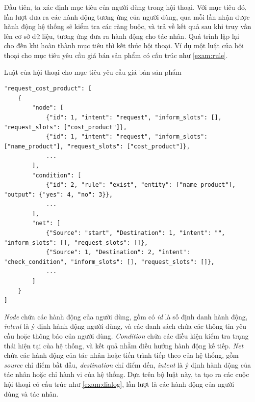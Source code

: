 Đầu tiên, ta xác định mục tiêu của người dùng trong hội thoại. Với
mục tiêu đó, lần lượt đưa ra các hành động tương ứng của người dùng,
qua mỗi lần nhận được hành động hệ thống sẽ kiểm tra các ràng buộc,
và trả về kết quả sau khi truy vấn lên cơ sở dữ liệu, tương ứng
đưa ra hành động cho tác nhân. Quá trình lặp lại cho đến khi
hoàn thành mục tiêu thì kết thúc hội thoại. Ví dụ một luật của
hội thoại cho mục tiêu yêu cầu giá bán sản phẩm có cấu trúc
như \ref{exam:rule}.

\renewcommand{\textboxenvname}{Ví dụ}
\begin{textbox}{Luật của hội thoại cho mục tiêu yêu cầu giá bán sản phẩm}
\begin{Verbatim}[breaklines=true, breakanywhere=true]
"request_cost_product": [
    {
        "node": [
            {"id": 1, "intent": "request", "inform_slots": [], "request_slots": ["cost_product"]},
            {"id": 1, "intent": "request", "inform_slots": ["name_product"], "request_slots": ["cost_product"]},
            ...
        ],
        "condition": [
            {"id": 2, "rule": "exist", "entity": ["name_product"], "output": {"yes": 4, "no": 3}},
            ...
        ],
        "net": [
            {"Source": "start", "Destination": 1, "intent": "", "inform_slots": [], "request_slots": []},
            {"Source": 1, "Destination": 2, "intent": "check_condition", "inform_slots": [], "request_slots": []},
            ...
        ]
    }
]
\end{Verbatim}
\end{textbox}

\textit{Node} chứa các hành động của người dùng, gồm có \textit{id}
là số định danh hành động, \textit{intent} là ý định hành động
người dùng, và các danh sách chứa các thông tin yêu cầu hoặc
thông báo của người dùng. \textit{Condition} chứa các điều kiện
kiểm tra trạng thái hiện tại của hệ thống, và kết quả nhằm
điều hướng hành động kế tiếp. \textit{Net} chứa các hành động
của tác nhân hoặc tiến trình tiếp theo của hệ thống, gồm
\textit{source} chỉ điểm bắt đầu, \textit{destination} chỉ điểm đến,
\textit{intent} là ý định hành động của tác nhân hoặc chỉ hành vi
của hệ thống. Dựa trên bộ luật này, ta tạo ra các cuộc hội thoại có
cấu trúc như \ref{exam:dialog}, lần lượt là các hành động của
người dùng và tác nhân.

